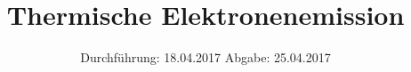 


\subject{V504}
\title{Thermische Elektronenemission}
\date{
	Durchführung: 18.04.2017
	\hspace{4em}
	Abgabe: 25.04.2017
}


	\maketitle
	\newpage
	\tableofcontents
	\newpage
	
	
	
	
	
	
	\newpage
	
	\printbibliography

